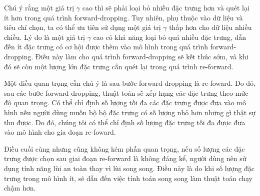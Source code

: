Chú ý rằng một giá trị $\gamma$ cao thì sẽ phải loại bỏ nhiều đặc trưng hơn và quét lại ít hơn trong quá trình forward-dropping. Tuy nhiên, phụ thuộc vào dữ liệu và tiêu chí chọn, ta có thể ưu tiên sử dụng một giá trị $\gamma$ thấp hơn cho dữ liệu nhiều chiều. Lý do là một giá trị $\gamma$ cao có khả năng loại bỏ quá nhiều đặc trưng, dẫn đến ít đặc trưng có cơ hội được thêm vào mô hình trong quá trình forward-dropping. Điều này làm cho quá trình forward-dropping sẽ kết thúc sớm, và khi đó sẽ còn một lượng lớn đặc trưng cần quét lại trong quá trình re-forward.

Một điều quan trọng cần chú ý là sau bước forward-dropping là re-foward. Do đó, sau các bước forward-dropping, thuật toán sẽ xếp hạng các đặc trưng theo mức độ quan trọng. Có thể chỉ định số lượng tối đa các đặc trưng được đưa vào mô hình nếu người dùng muốn bộ bộ đặc trưng có số lượng nhỏ hơn những gì thật sự thu được. Do đó, chúng tôi có thể chỉ định số lượng đặc trưng tối đa được đưa vào mô hình cho gia đoạn re-foward.

Điều cuối cùng nhưng cũng không kém phần quan trọng, nếu số lượng các đặc trưng được chọn sau giai đoạn re-forward là không đáng kể, người dùng nên sử dụng tính năng lùi an toàn thay vì lùi song song. Điều này là do khi số lượng đặc trưng trong mô hình ít, sẽ dẫn đến việc tính toán song song làm thuật toán chạy chậm hơn.

